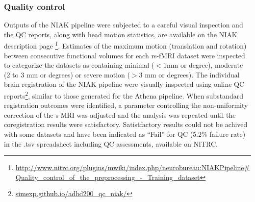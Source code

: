 \documentclass[preprint,12pt,3p]{elsarticle}
\begin{document}
\subsubsection{Quality control}

Outputs of the NIAK pipeline were subjected to a careful visual inspection and the QC reports, along with head motion statistics, are available on the NIAK description page \footnote{\url{http://www.nitrc.org/plugins/mwiki/index.php/neurobureau:NIAKPipeline#Quality_control_of_the_preprocessing_-_Training_dataset}}. Estimates of the maximum motion (translation and rotation) between consecutive functional volumes for each rs-fMRI dataset were inspected to categorize the datasets as containing minimal ($<$1mm or degree), moderate (2 to 3 mm or degrees) or severe motion ($>$3 mm or degrees). The individual brain registration of the NIAK pipeline were visually inspected using online QC reports\footnote{\url{simexp.github.io/adhd200_qc_niak/}}, similar to those generated for the Athena pipeline. When substandard registration outcomes were identified, a parameter controlling the non-uniformity correction of the s-MRI was adjusted and the analysis was repeated until the coregistration results were satisfactory. Satistfactory results could not be achived with some datasets and have been indicated as ``Fail'' for QC ($5.2\%$ failure rate) in the .tsv spreadsheet including QC assessments, available on NITRC. 
\end{document}
